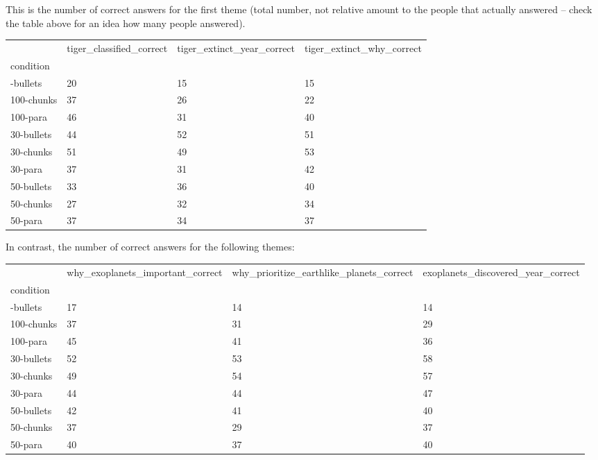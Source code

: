 \documentclass[
  letterpaper,
  DIV=11,
  numbers=noendperiod]{scrartcl}
\newcounter{none} %
\begin{document}
This is the number of correct answers for the first theme (total number,
not relative amount to the people that actually answered -- check the
table above for an idea how many people answered).

{\def\LTcaptype{none} %
\begin{longtable}[]{@{}llll@{}}
\toprule\noalign{}
& tiger\_classified\_correct & tiger\_extinct\_year\_correct &
tiger\_extinct\_why\_correct \\
condition & & & \\
\midrule\noalign{}
\endhead
\bottomrule\noalign{}
\endlastfoot
100-bullets & 20 & 15 & 15 \\
100-chunks & 37 & 26 & 22 \\
100-para & 46 & 31 & 40 \\
30-bullets & 44 & 52 & 51 \\
30-chunks & 51 & 49 & 53 \\
30-para & 37 & 31 & 42 \\
50-bullets & 33 & 36 & 40 \\
50-chunks & 27 & 32 & 34 \\
50-para & 37 & 34 & 37 \\
\end{longtable}
}

In contrast, the number of correct answers for the following themes:

{\def\LTcaptype{none} %
\begin{longtable}[]{@{}llll@{}}
\toprule\noalign{}
& why\_exoplanets\_important\_correct &
why\_prioritize\_earthlike\_planets\_correct &
exoplanets\_discovered\_year\_correct \\
condition & & & \\
\midrule\noalign{}
\endhead
\bottomrule\noalign{}
\endlastfoot
100-bullets & 17 & 14 & 14 \\
100-chunks & 37 & 31 & 29 \\
100-para & 45 & 41 & 36 \\
30-bullets & 52 & 53 & 58 \\
30-chunks & 49 & 54 & 57 \\
30-para & 44 & 44 & 47 \\
50-bullets & 42 & 41 & 40 \\
50-chunks & 37 & 29 & 37 \\
50-para & 40 & 37 & 40 \\
\end{longtable}
}
\end{document}
